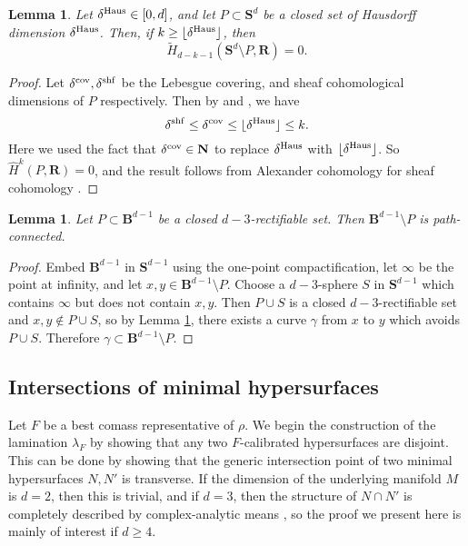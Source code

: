 \documentclass[reqno,11pt]{amsart}
\newcommand{\NN}{\mathbf{N}}
\newcommand{\RR}{\mathbf{R}}
\newcommand{\Sph}{\mathbf S}
\newcommand{\Ball}{\mathbf{B}}
\newtheorem{lemma}[theorem]{Lemma}
\theoremstyle{definition}
\numberwithin{equation}{section}
\begin{document}
\begin{lemma}\label{closed mfld complement}
Let $\delta^{\rm Haus} \in [0, d]$, and let $P \subset \Sph^d$ be a closed set of Hausdorff dimension $\delta^{\rm Haus}$.
Then, if $k \geq \lfloor \delta^{\rm Haus} \rfloor$, then
$$\tilde H_{d - k - 1}(\Sph^d \setminus P, \RR) = 0.$$
\end{lemma}
\begin{proof}
Let $\delta^{\rm cov}, \delta^{\rm shf}$ be the Lebesgue covering, and sheaf cohomological dimensions of $P$ respectively.
Then by \cite[{\S}II.5.12]{godement1973topologie} and \cite[Theorem 6.3.10]{edgar2008measure}, we have 
$$\delta^{\rm shf} \leq \delta^{\rm cov} \leq \lfloor \delta^{\rm Haus} \rfloor \leq k.$$
Here we used the fact that $\delta^{\rm cov} \in \NN$ to replace $\delta^{\rm Haus}$ with $\lfloor \delta^{\rm Haus} \rfloor$.
So $\hat H^k(P, \RR) = 0$, and the result follows from Alexander cohomology for sheaf cohomology \cite[Theorem 6]{Kaplan47}.
\end{proof}

\begin{lemma}\label{open mfld complement}
Let $P \subset \Ball^{d - 1}$ be a closed $d - 3$-rectifiable set.
Then $\Ball^{d - 1} \setminus P$ is path-connected.
\end{lemma}
\begin{proof}
Embed $\Ball^{d - 1}$ in $\Sph^{d - 1}$ using the one-point compactification, let $\infty$ be the point at infinity, and let $x, y \in \Ball^{d - 1} \setminus P$.
Choose a $d - 3$-sphere $S$ in $\Sph^{d - 1}$ which contains $\infty$ but does not contain $x, y$.
Then $P \cup S$ is a closed $d - 3$-rectifiable set and $x, y \notin P \cup S$, so by Lemma \ref{closed mfld complement}, there exists a curve $\gamma$ from $x$ to $y$ which avoids $P \cup S$.
Therefore $\gamma \subset \Ball^{d - 1} \setminus P$.
\end{proof}

\subsection{Intersections of minimal hypersurfaces}\label{nodal appendix}
Let $F$ be a best comass representative of $\rho$.
We begin the construction of the lamination $\lambda_F$ by showing that any two $F$-calibrated hypersurfaces are disjoint.
This can be done by showing that the generic intersection point of two minimal hypersurfaces $N, N'$ is transverse.
If the dimension of the underlying manifold $M$ is $d = 2$, then this is trivial, and if $d = 3$, then the structure of $N \cap N'$ is completely described by complex-analytic means \cite[Theorem 7.3]{colding2011course}, so the proof we present here is mainly of interest if $d \geq 4$.
\end{document}
